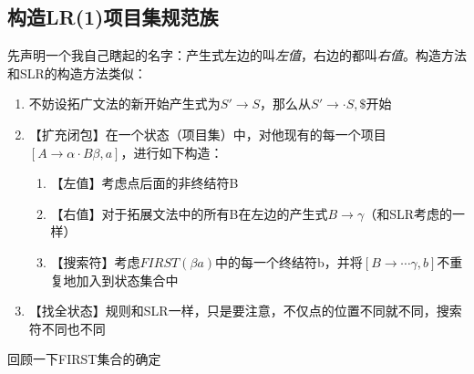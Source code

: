 \documentclass[]{report}
\begin{document}
		\subsection{构造LR(1)项目集规范族}
		先声明一个我自己瞎起的名字：产生式左边的叫\textit{左值}，右边的都叫\textit{右值}。构造方法和SLR的构造方法类似：
		\begin{enumerate}
			\item 不妨设拓广文法的新开始产生式为$S'\to S$，那么从$S'\to\cdot S,\$$开始
			\item 【扩充闭包】在一个状态（项目集）中，对他现有的每一个项目$[A\to\alpha\cdot B\beta,a]$，进行如下构造：
			\begin{enumerate}
				\item 【左值】考虑点后面的非终结符B
				\item 【右值】对于拓展文法中的所有B在左边的产生式$B\to\gamma$（和SLR考虑的一样）
				\item 【搜索符】考虑$FIRST(\beta a)$中的每一个终结符b，并将$[B\to\cdots\gamma,b]$不重复地加入到状态集合中
			\end{enumerate}
			\item 【找全状态】规则和SLR一样，只是要注意，不仅点的位置不同就不同，搜索符不同也不同
		\end{enumerate}
		回顾一下FIRST集合的确定
\end{document}
